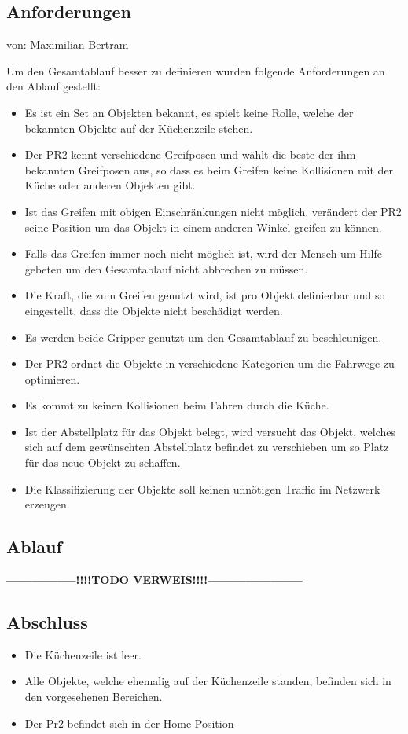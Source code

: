 \documentclass{suturo}
\makeatletter
\newcommand{\chapterauthor}[1]{%
  {\parindent0pt\vspace*{-27pt}%
  \linespread{0}\small\begin{flushright}von: #1\end{flushright}%
  \par\nobreak\vspace*{0pt}}
  \@afterheading%
}
\makeatother
\begin{document}
\subsection{Anforderungen}
\chapterauthor{Maximilian Bertram}
Um den Gesamtablauf besser zu definieren wurden folgende Anforderungen an den Ablauf gestellt:
\begin{itemize}
\item Es ist ein Set an Objekten bekannt, es spielt keine Rolle, welche der bekannten Objekte auf der Küchenzeile stehen.
\item Der PR2 kennt verschiedene Greifposen und wählt die beste der ihm bekannten Greifposen aus, so dass es beim Greifen keine Kollisionen mit der Küche oder anderen Objekten gibt.
\item Ist das Greifen mit obigen Einschränkungen nicht möglich, verändert der PR2 seine Position um das Objekt in einem anderen Winkel greifen zu können.
\item Falls das Greifen immer noch nicht möglich ist, wird der Mensch um Hilfe gebeten um den Gesamtablauf nicht abbrechen zu müssen.
\item Die Kraft, die zum Greifen genutzt wird, ist pro Objekt definierbar und so eingestellt, dass die Objekte nicht beschädigt werden.
\item Es werden beide Gripper genutzt um den Gesamtablauf zu beschleunigen.
\item Der PR2 ordnet die Objekte in verschiedene Kategorien um die Fahrwege zu optimieren.
\item Es kommt zu keinen Kollisionen beim Fahren durch die Küche.
\item Ist der Abstellplatz für das Objekt belegt, wird versucht das Objekt, welches sich auf dem gewünschten Abstellplatz befindet zu verschieben um so Platz für das neue Objekt zu schaffen.
\item Die Klassifizierung der Objekte soll keinen unnötigen Traffic im Netzwerk erzeugen.
\end{itemize}


\subsection{Ablauf}
\textbf{-----------------!!!!TODO VERWEIS!!!!-----------------------}


\subsection{Abschluss}
\begin{itemize}
\item Die Küchenzeile ist leer.
\item Alle Objekte, welche ehemalig auf der Küchenzeile standen, befinden sich in den vorgesehenen Bereichen.
\item Der Pr2 befindet sich in der Home-Position
\end{itemize}
\end{document}
